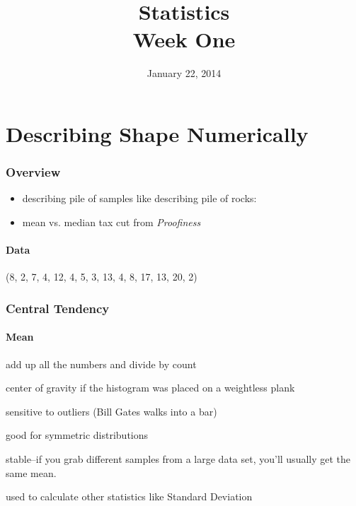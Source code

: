\documentclass{exam}
\author{}
\date{January 22, 2014}
\title{Statistics \\ Week One}
\begin{document}
  \maketitle
  \tableofcontents

  \pagebreak

  \part{Describing Shape Numerically}

  \section{Overview}

  \begin{itemize}
    \item describing pile of samples like describing pile of rocks:

    \item mean vs. median tax cut from {\em Proofiness}

  \end{itemize}

  \subsection{Data}
  (8, 2, 7, 4, 12, 4, 5, 3, 13, 4, 8, 17, 13, 20, 2)

  \section{Central Tendency}

  \subsection{Mean}

  \begin{itemize*}
    \item add up all the numbers and divide by count

    \item center of gravity if the histogram was placed on a weightless plank

    \item sensitive to outliers (Bill Gates walks into a bar)

    \item good for symmetric distributions

    \item stable--if you grab different samples from a large data set, you'll usually get
      the same mean.

    \item used to calculate other statistics like Standard Deviation
  \end{itemize*}
\end{document}
